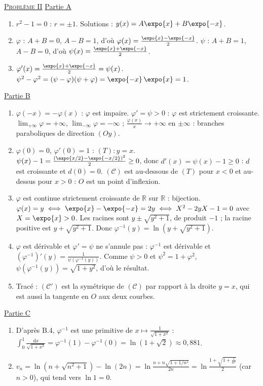 \begin{corrige}
\noindent \underline{\textsc{Probl\`eme II}} \newline
\underline{Partie A}
\begin{enumerate}
\item $r^2 - 1 = 0$ : $r = \pm 1$. Solutions : $y(x) = A\expo{x} + B\expo{-x}$.
\item $\varphi$ : $A + B = 0$, $A - B = 1$, d'o\`u $\varphi(x) = \frac{\expo{x} - \expo{-x}}{2}$. $\psi$ : $A + B = 1$, $A - B = 0$, d'o\`u
      $\psi(x) = \frac{\expo{x} + \expo{-x}}{2}$.
\item $\varphi'(x) = \frac{\expo{x} + \expo{-x}}{2} = \psi(x)$. $\psi^2 - \varphi^2 = (\psi - \varphi)(\psi + \varphi) = \expo{-x}\,\expo{x} = 1$.
\end{enumerate}
\underline{Partie B}
\begin{enumerate}
\item $\varphi(-x) = -\varphi(x)$ : $\varphi$ est impaire. $\varphi' = \psi > 0$ : $\varphi$ est strictement croissante.
      $\lim_{+\infty}\varphi = +\infty$, $\lim_{-\infty}\varphi = -\infty$ ; $\frac{\varphi(x)}{x} \to +\infty$ en $\pm\infty$ : branches paraboliques de direction $(Oy)$.
\item $\varphi(0) = 0$, $\varphi'(0) = 1$ : $(T) : y = x$. $\psi(x) - 1 = \frac{(\expo{x/2} - \expo{-x/2})^2}{2} \geq 0$, donc $d'(x) = \psi(x) - 1 \geq 0$ :
      $d$ est croissante et $d(0) = 0$. $(\mathscr{C})$ est au-dessous de $(T)$ pour $x < 0$ et au-dessus pour $x > 0$ : $O$ est un point d'inflexion.
\item $\varphi$ est continue strictement croissante de $\mathbb{R}$ sur $\mathbb{R}$ : bijection. $\varphi(x) = y \iff \expo{x} - \expo{-x} = 2y \iff X^2 - 2yX - 1 = 0$
      avec $X = \expo{x} > 0$. Les racines sont $y \pm \sqrt{y^2 + 1}$, de produit $-1$ ; la racine positive est $y + \sqrt{y^2 + 1}$.
      Donc $\varphi^{-1}(y) = \ln\left(y + \sqrt{y^2 + 1}\right)$.
\item $\varphi$ est d\'erivable et $\varphi' = \psi$ ne s'annule pas : $\varphi^{-1}$ est d\'erivable et
      $(\varphi^{-1})'(y) = \frac{1}{\psi(\varphi^{-1}(y))}$. Comme $\psi > 0$ et $\psi^2 = 1 + \varphi^2$, $\psi(\varphi^{-1}(y)) = \sqrt{1 + y^2}$, d'o\`u le r\'esultat.
\item Trac\'e : $(\mathscr{C}')$ est la sym\'etrique de $(\mathscr{C})$ par rapport \`a la droite $y = x$, qui est aussi la tangente en $O$ aux deux courbes.
\end{enumerate}
\underline{Partie C}
\begin{enumerate}
\item D'apr\`es B.4, $\varphi^{-1}$ est une primitive de $x \mapsto \frac{1}{\sqrt{1 + x^2}}$ :
      $\displaystyle\int_0^1 \frac{\mathrm{d}x}{\sqrt{1 + x^2}} = \varphi^{-1}(1) - \varphi^{-1}(0) = \ln(1 + \sqrt{2}) \approx 0{,}881$.
\item $v_n = \ln\left(n + \sqrt{n^2 + 1}\right) - \ln(2n) = \ln\frac{n + n\sqrt{1 + 1/n^2}}{2n} = \ln\frac{1 + \sqrt{1 + \frac{1}{n^2}}}{2}$
      (car $n > 0$), qui tend vers $\ln 1 = 0$.
\end{enumerate}
\end{corrige}
